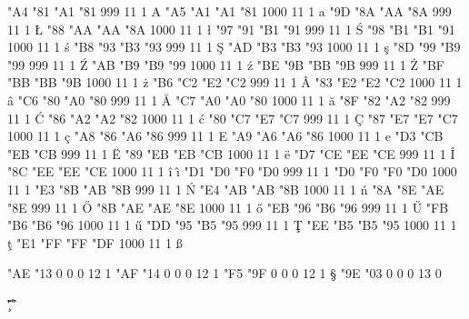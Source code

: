 \setcharcode  "A4  "81  "A1  "81   999  11  1  \texaccent \og A
\setcharcode  "A5  "A1  "A1  "81  1000  11  1  \texaccent \og a
\setcharcode  "9D  "8A  "AA  "8A   999  11  1  \texmacro  \L
\setcharcode  "88  "AA  "AA  "8A  1000  11  1  \texmacro  \l
\setcharcode  "97  "91  "B1  "91   999  11  1  \texaccent \'S
\setcharcode  "98  "B1  "B1  "91  1000  11  1  \texaccent \'s
\setcharcode  "B8  "93  "B3  "93   999  11  1  \texaccent \c S
\setcharcode  "AD  "B3  "B3  "93  1000  11  1  \texaccent \c s
\setcharcode  "8D  "99  "B9  "99   999  11  1  \texaccent \'Z
\setcharcode  "AB  "B9  "B9  "99  1000  11  1  \texaccent \'z
\setcharcode  "BE  "9B  "BB  "9B   999  11  1  \texaccent \.Z
\setcharcode  "BF  "BB  "BB  "9B  1000  11  1  \texaccent \.z
\setcharcode  "B6  "C2  "E2  "C2   999  11  1  \texaccent \^A
\setcharcode  "83  "E2  "E2  "C2  1000  11  1  \texaccent \^a
\setcharcode  "C6  "80  "A0  "80   999  11  1  \texaccent \u A
\setcharcode  "C7  "A0  "A0  "80  1000  11  1  \texaccent \u a
\setcharcode  "8F  "82  "A2  "82   999  11  1  \texaccent \'C
\setcharcode  "86  "A2  "A2  "82  1000  11  1  \texaccent \'c
\setcharcode  "80  "C7  "E7  "C7   999  11  1  \texaccent \c C
\setcharcode  "87  "E7  "E7  "C7  1000  11  1  \texaccent \c c
\setcharcode  "A8  "86  "A6  "86   999  11  1  \texaccent \og E
\setcharcode  "A9  "A6  "A6  "86  1000  11  1  \texaccent \og e
\setcharcode  "D3  "CB  "EB  "CB   999  11  1  \texaccent \"E
\setcharcode  "89  "EB  "EB  "CB  1000  11  1  \texaccent \"e
\setcharcode  "D7  "CE  "EE  "CE   999  11  1  \texaccent \^I
\setcharcode  "8C  "EE  "EE  "CE  1000  11  1  \texaccent \^i  \texaccent \^\i
\setcharcode  "D1  "D0  "F0  "D0   999  11  1  \texmacro \Dslash
\setcharcode  "D0  "F0  "F0  "D0  1000  11  1  \texmacro \dslash
\setcharcode  "E3  "8B  "AB  "8B   999  11  1  \texaccent \'N
\setcharcode  "E4  "AB  "AB  "8B  1000  11  1  \texaccent \'n
\setcharcode  "8A  "8E  "AE  "8E   999  11  1  \texaccent \H O
\setcharcode  "8B  "AE  "AE  "8E  1000  11  1  \texaccent \H o
\setcharcode  "EB  "96  "B6  "96   999  11  1  \texaccent \H U
\setcharcode  "FB  "B6  "B6  "96  1000  11  1  \texaccent \H u
\setcharcode  "DD  "95  "B5  "95   999  11  1  \texaccent \c T
\setcharcode  "EE  "B5  "B5  "95  1000  11  1  \texaccent \c t
\setcharcode  "E1  "FF  "FF  "DF  1000  11  1  \texmacro  \ss


\setcharcode  "AE  "13    0    0     0  12  1  %
\setcharcode  "AF  "14    0    0     0  12  1  %
\setcharcode  "F5  "9F    0    0     0  12  1  \texmacro \S
\setcharcode  "9E  "03    0    0     0  13  0  \expandto {$\times$}

\redefaccent \'
\redefaccent \v 
\redefaccent \" 
\redefaccent \.
\redefaccent \c 
\redefaccent \^ 
\redefaccent \r 
\redefaccent \H
\redefaccent \og

